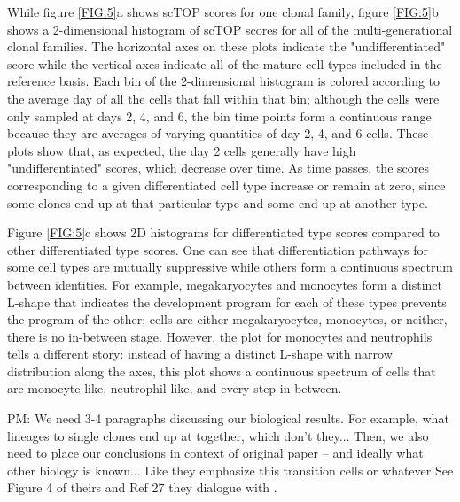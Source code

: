 \documentclass[aps,superscriptaddress, notitlepage,longbibliography]{revtex4-1}
\begin{document}
While figure \ref{FIG:5}a shows scTOP scores for one clonal family, figure \ref{FIG:5}b shows a 2-dimensional histogram of scTOP scores for all of the multi-generational clonal families. The horizontal axes on these plots indicate the "undifferentiated" score while the vertical axes indicate all of the mature cell types included in the reference basis. Each bin of the 2-dimensional histogram is colored according to the average day of all the cells that fall within that bin; although the cells were only sampled at days 2, 4, and 6, the bin time points form a continuous range because they are averages of varying quantities of day 2, 4, and 6 cells. These plots show that, as expected, the day 2 cells generally have high "undifferentiated" scores, which decrease over time. As time passes, the scores corresponding to a given differentiated cell type increase or remain at zero, since some clones end up at that particular type and some end up at another type. 

Figure \ref{FIG:5}c shows 2D histograms for differentiated type scores compared to other differentiated type scores. One can see that differentiation pathways for some cell types are mutually suppressive while others form a continuous spectrum between identities. For example, megakaryocytes and monocytes form a distinct L-shape that indicates the development program for each of these types prevents the program of the other; cells are either megakaryocytes, monocytes, or neither, there is no in-between stage. However, the plot for monocytes and neutrophils tells a different story: instead of having a distinct L-shape with narrow distribution along the axes, this plot shows a continuous spectrum of cells that are monocyte-like, neutrophil-like, and every step in-between. 

{\color{red} PM: We need 3-4 paragraphs discussing our biological results. For example, what lineages to single clones end up at together, which don't they... Then, we also need to place our conclusions in context of original paper -- and ideally what other biology is known... Like they emphasize this transition cells or whatever See Figure 4 of theirs and Ref 27 they dialogue with . }
\end{document}
